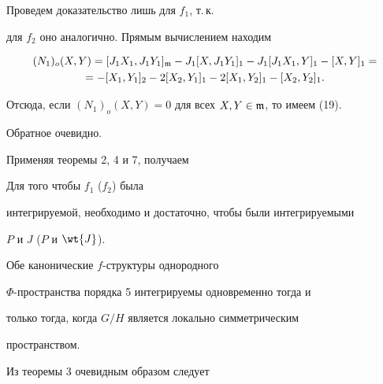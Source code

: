 \begin{pf}


Проведем доказательство лишь для $f_1$, т.\,к.


для $f_2$ оно аналогично. Прямым вычислением находим


\begin{multline*}


(N_1)_o(X,Y)=[J_1X_1,J_1Y_1]_{\frak{m}}-


J_1[X,J_1Y_1]_1-J_1[J_1X_1,Y]_1-[X,Y]_1= \\


= -[X_1,Y_1]_2-2[X_2,Y_1]_1-2[X_1,Y_2]_1-[X_2,Y_2]_1.


\end{multline*}


Отсюда, если $(N_1)_o(X,Y)=0$ для всех $X,Y \in \frak{m}$, то имеем (19).


Обратное очевидно.


\end{pf}





Применяя теоремы 2, 4 и 7, получаем


\setcounter{cor}{0}





\begin{cor}


Для того чтобы $f_1$ ($f_2$) была


интегрируемой, необходимо и достаточно, чтобы были интегрируемыми


$P$ и $J$ ($P$ и $ \wt{J}$).


\end{cor}





\begin{cor}


Обе канонические $f$-структуры однородного


$\Phi$-пространства порядка 5 интегрируемы одновременно тогда и


только тогда, когда $G/H$ является локально симметрическим


пространством.


\end{cor}





Из теоремы 3 очевидным образом следует





